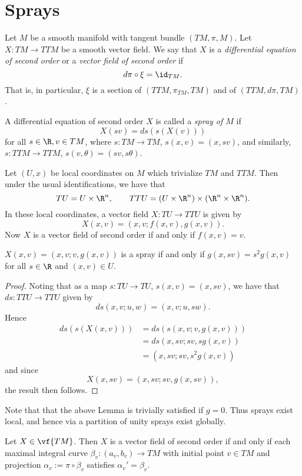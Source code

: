 



\section{Sprays}

Let $M$ be a smooth manifold with tangent bundle $(TM,\pi,M)$.  Let $X:TM\to TTM$ be a smooth vector field.  We say that $X$ is a \textit{differential equation of second order} or a \textit{vector field of second order} if
$$d\pi\circ\xi=\id_{TM}.$$
That is, in particular, $\xi$ is a section of $(TTM,\pi_{TM},TM)$ and of $(TTM,d\pi,TM)$.  

A differential equation of second order $X$ is called a \textit{spray of $M$} if 
$$X(sv)=ds(s(X(v)))$$
for all $s\in\R, v\in TM$, where $s:TM\to TM$, $s(x,v)=(x,sv)$, and similarly, $s:TTM\to TTM$, $s(v,\theta)=(sv,s\theta)$.

Let $(U,x)$ be local coordinates on $M$ which trivialize $TM$ and $TTM$.  Then under the usual identifications, we have that
$$TU=U\times\R^n,\qquad TTU=(U\times\R^n)\times (\R^n\times\R^n).$$
In these local coordinates, a vector field $X:TU\to TTU$ is given by
$$X(x,v)=(x,v;f(x,v),g(x,v)).$$
Now $X$ is a vector field of second order if and only if $f(x,v)=v$.

\begin{lem}
    $X(x,v)=(x,v;v,g(x,v))$ is a spray if and only if $g(x,sv)=s^2g(x,v)$ for all $s\in\R$ and $(x,v)\in U$.
\end{lem}

\begin{proof}
Noting that as a map $s:TU\to TU$, $s(x,v)=(x,sv)$, we have that $ds:TTU\to TTU$ given by
$$ds(x,v;u,w)=(x,v;u,sw).$$
Hence
\begin{align*}
	ds(s(X(x,v)))&=ds(s(x,v;v,g(x,v)))\\
	&=ds(x,sv;sv,sg(x,v))\\
	&=(x,sv;sv,s^2g(x,v))
\end{align*}
and since
$$X(x,sv)=(x,sv;sv,g(x,sv)),$$
the result then follows.
\end{proof}

Note that that the above Lemma is trivially satisfied if $g=0$.  Thus sprays exist local, and hence via a partition of unity sprays exist globally.


\begin{prop}
    Let $X\in\vf{TM}$.  Then $X$ is a vector field of second order if and only if each maximal integral curve $\beta_v:(a_v,b_v)\to TM$ with initial point $v\in TM$ and projection $\alpha_v:=\pi\circ\beta_v$ satisfies $\alpha_v'=\beta_v$.
\end{prop}

